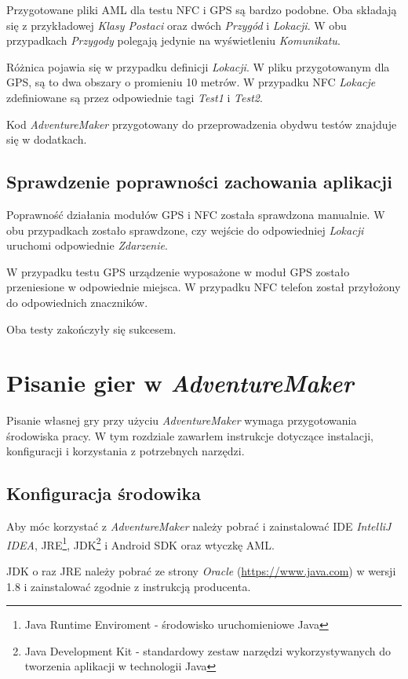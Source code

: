 \documentclass[openright]{xmgr}
\begin{document}
Przygotowane pliki AML dla testu NFC i GPS są bardzo podobne. Oba składają się z przykładowej \textit{Klasy Postaci} oraz dwóch \textit{Przygód} i \textit{Lokacji}. W obu przypadkach \textit{Przygody} polegają jedynie na wyświetleniu \textit{Komunikatu}. 

Różnica pojawia się w przypadku definicji \textit{Lokacji}. W pliku przygotowanym dla GPS, są to dwa obszary o promieniu 10 metrów. W przypadku NFC \textit{Lokacje} zdefiniowane są przez odpowiednie tagi \textit{Test1} i \textit{Test2}.

Kod \textit{AdventureMaker} przygotowany do przeprowadzenia obydwu testów znajduje się w dodatkach.

\section{Sprawdzenie poprawności zachowania aplikacji}

Poprawność działania modułów GPS i NFC została sprawdzona manualnie. W obu przypadkach zostało sprawdzone, czy wejście do odpowiedniej \textit{Lokacji} uruchomi odpowiednie \textit{Zdarzenie}.

W przypadku testu GPS urządzenie wyposażone w moduł GPS zostało przeniesione w odpowiednie miejsca. W przypadku NFC telefon został przyłożony do odpowiednich znaczników. 

Oba testy zakończyły się sukcesem.  

\chapter{Pisanie gier w \textit{AdventureMaker}}
Pisanie własnej gry przy użyciu \textit{AdventureMaker} wymaga przygotowania środowiska pracy. W tym rozdziale zawarłem instrukcje dotyczące instalacji, konfiguracji i korzystania z potrzebnych narzędzi. 

\section{Konfiguracja środowika}

Aby móc korzystać z \textit{AdventureMaker} należy pobrać i zainstalować IDE \textit{IntelliJ IDEA}, JRE\footnote{Java Runtime Enviroment - środowisko uruchomieniowe Java}, JDK\footnote{Java Development Kit - standardowy zestaw narzędzi wykorzystywanych do tworzenia aplikacji w technologii Java} i Android SDK oraz wtyczkę AML.

JDK o raz JRE należy pobrać ze strony \textit{Oracle} (\url{https://www.java.com}) w wersji 1.8 i zainstalować zgodnie z instrukcją producenta.
\end{document}
